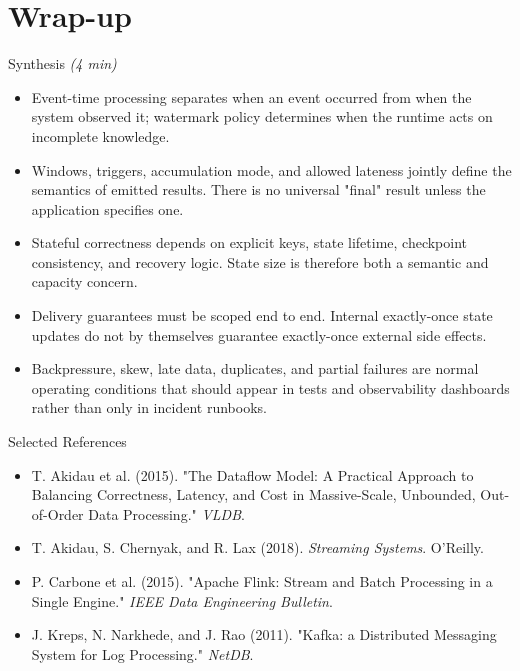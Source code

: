 \documentclass[aspectratio=169,11pt]{beamer}
\newcommand{\mins}[1]{\textit{(#1 min)}}
\begin{document}
\section{Wrap-up}

\begin{frame}{Synthesis \mins{4}}
  \begin{itemize}
    \item Event-time processing separates when an event occurred from when the system observed it; watermark policy determines when the runtime acts on incomplete knowledge.
    \item Windows, triggers, accumulation mode, and allowed lateness jointly define the semantics of emitted results. There is no universal "final" result unless the application specifies one.
    \item Stateful correctness depends on explicit keys, state lifetime, checkpoint consistency, and recovery logic. State size is therefore both a semantic and capacity concern.
    \item Delivery guarantees must be scoped end to end. Internal exactly-once state updates do not by themselves guarantee exactly-once external side effects.
    \item Backpressure, skew, late data, duplicates, and partial failures are normal operating conditions that should appear in tests and observability dashboards rather than only in incident runbooks.
  \end{itemize}
\end{frame}

\begin{frame}{Selected References}
  \small
  \begin{itemize}
    \item T. Akidau et al. (2015). "The Dataflow Model: A Practical Approach to Balancing Correctness, Latency, and Cost in Massive-Scale, Unbounded, Out-of-Order Data Processing." \textit{VLDB}.
    \item T. Akidau, S. Chernyak, and R. Lax (2018). \textit{Streaming Systems}. O'Reilly.
    \item P. Carbone et al. (2015). "Apache Flink: Stream and Batch Processing in a Single Engine." \textit{IEEE Data Engineering Bulletin}.
    \item J. Kreps, N. Narkhede, and J. Rao (2011). "Kafka: a Distributed Messaging System for Log Processing." \textit{NetDB}.
  \end{itemize}
\end{frame}
\end{document}

